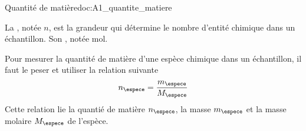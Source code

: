 \begin{doc}{Quantité de matière}{doc:A1_quantite_matiere}
  \begin{encart}
    La , notée $n$, est la grandeur qui détermine le nombre d'entité chimique dans un échantillon.
    Son , notée \unit{\mole}.
  \end{encart}

  Pour mesurer la quantité de matière d'une espèce chimique dans un échantillon,
  il faut le peser et utiliser la relation suivante
  \begin{equation*}
    n_\espece = \dfrac{m_\espece}{M_\espece}
  \end{equation*}
  Cette relation lie la quantié de matière $n_\espece$, la masse $m_\espece$ et la masse molaire $M_\espece$ de l'espèce.
\end{doc}

